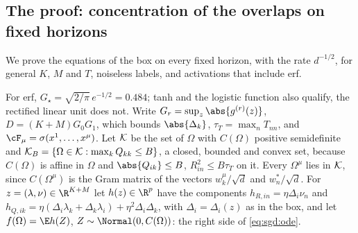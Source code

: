 \begin{refsection}
\section{The proof: concentration of the overlaps on fixed horizons}\label{sec:sgd:proof}

We prove the equations of the box on every fixed horizon, with the rate $d^{-1/2}$, for general $K$, $M$ and $T$, noiseless labels, and activations that include erf.


For erf, $G_\star=\sqrt{2/\pi}\,e^{-1/2}=0.484$; tanh and the logistic function also qualify, the rectified linear unit does not. Write $G_r=\sup_z\abs{g^{(r)}(z)}$, $D=(K+M)G_0G_1$, which bounds $\abs{\Delta_k}$, $\tau_T=\max_nT_{nn}$, and $\cF_\mu=\sigma(x^1,\dots,x^\mu)$. Let $\mathcal K$ be the set of $\Omega$ with $C(\Omega)$ positive semidefinite and $\mathcal K_B=\{\Omega\in\mathcal K:\max_kQ_{kk}\le B\}$, a closed, bounded and convex set, because $C(\Omega)$ is affine in $\Omega$ and $\abs{Q_{ik}}\le B$, $R_{in}^2\le B\tau_T$ on it. Every $\Omega^\mu$ lies in $\mathcal K$, since $C(\Omega^\mu)$ is the Gram matrix of the vectors $w^\mu_k/\sqrt d$ and $w^*_n/\sqrt d$. For $z=(\lambda,\nu)\in\R^{K+M}$ let $h(z)\in\R^p$ have the components $h_{R,in}=\eta\Delta_i\nu_n$ and $h_{Q,ik}=\eta(\Delta_i\lambda_k+\Delta_k\lambda_i)+\eta^2\Delta_i\Delta_k$, with $\Delta_i=\Delta_i(z)$ as in the box, and let $f(\Omega)=\E h(Z)$, $Z\sim\Normal(0,C(\Omega))$: the right side of \eqref{eq:sgd:ode}.


\end{refsection}
